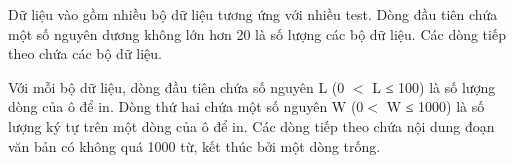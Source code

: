 Dữ liệu vào gồm nhiều bộ dữ liệu tương ứng với nhiều test. Dòng đầu tiên chứa một số nguyên dương không lớn hơn 20 là số lượng các bộ dữ liệu. Các dòng tiếp theo chứa các bộ dữ liệu.  

   Với mỗi bộ dữ liệu, dòng đầu tiên chứa số nguyên L (0 $<$ L ≤ 100) là số lượng dòng của ô để in. Dòng thứ hai chứa một số nguyên W (0$<$ W ≤ 1000) là số lượng ký tự trên một dòng của ô để in. Các dòng tiếp theo chứa nội dung đoạn văn bản có không quá 1000 từ, kết thúc bởi một dòng trống.